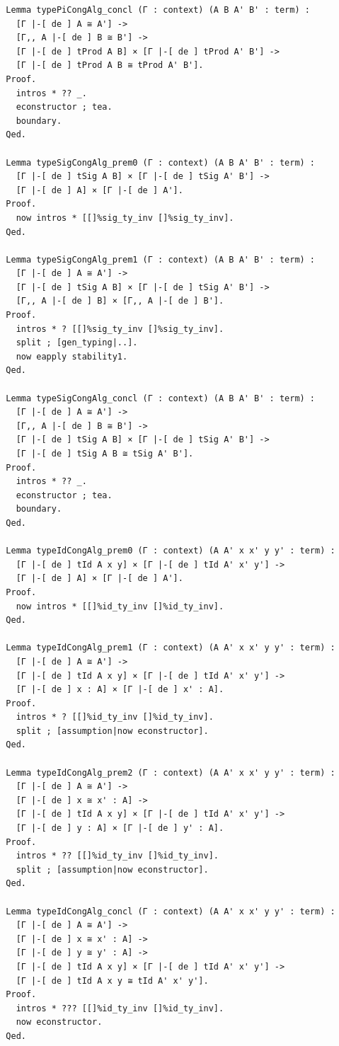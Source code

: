\begin{lstlisting}
  Lemma typePiCongAlg_concl (Γ : context) (A B A' B' : term) :
    [Γ |-[ de ] A ≅ A'] ->
    [Γ,, A |-[ de ] B ≅ B'] ->
    [Γ |-[ de ] tProd A B] × [Γ |-[ de ] tProd A' B'] ->
    [Γ |-[ de ] tProd A B ≅ tProd A' B'].
  Proof.
    intros * ?? _.
    econstructor ; tea.
    boundary.
  Qed.

  Lemma typeSigCongAlg_prem0 (Γ : context) (A B A' B' : term) :
    [Γ |-[ de ] tSig A B] × [Γ |-[ de ] tSig A' B'] ->
    [Γ |-[ de ] A] × [Γ |-[ de ] A'].
  Proof.
    now intros * [[]%sig_ty_inv []%sig_ty_inv].
  Qed.

  Lemma typeSigCongAlg_prem1 (Γ : context) (A B A' B' : term) :
    [Γ |-[ de ] A ≅ A'] ->
    [Γ |-[ de ] tSig A B] × [Γ |-[ de ] tSig A' B'] ->
    [Γ,, A |-[ de ] B] × [Γ,, A |-[ de ] B'].
  Proof.
    intros * ? [[]%sig_ty_inv []%sig_ty_inv].
    split ; [gen_typing|..].
    now eapply stability1.
  Qed.
  
  Lemma typeSigCongAlg_concl (Γ : context) (A B A' B' : term) :
    [Γ |-[ de ] A ≅ A'] ->
    [Γ,, A |-[ de ] B ≅ B'] ->
    [Γ |-[ de ] tSig A B] × [Γ |-[ de ] tSig A' B'] ->
    [Γ |-[ de ] tSig A B ≅ tSig A' B'].
  Proof.
    intros * ?? _.
    econstructor ; tea.
    boundary.
  Qed.

  Lemma typeIdCongAlg_prem0 (Γ : context) (A A' x x' y y' : term) :
    [Γ |-[ de ] tId A x y] × [Γ |-[ de ] tId A' x' y'] ->
    [Γ |-[ de ] A] × [Γ |-[ de ] A'].
  Proof.
    now intros * [[]%id_ty_inv []%id_ty_inv].
  Qed.
  
  Lemma typeIdCongAlg_prem1 (Γ : context) (A A' x x' y y' : term) :
    [Γ |-[ de ] A ≅ A'] ->
    [Γ |-[ de ] tId A x y] × [Γ |-[ de ] tId A' x' y'] ->
    [Γ |-[ de ] x : A] × [Γ |-[ de ] x' : A].
  Proof.
    intros * ? [[]%id_ty_inv []%id_ty_inv].
    split ; [assumption|now econstructor].
  Qed.

  Lemma typeIdCongAlg_prem2 (Γ : context) (A A' x x' y y' : term) :
    [Γ |-[ de ] A ≅ A'] ->
    [Γ |-[ de ] x ≅ x' : A] ->
    [Γ |-[ de ] tId A x y] × [Γ |-[ de ] tId A' x' y'] ->
    [Γ |-[ de ] y : A] × [Γ |-[ de ] y' : A].
  Proof.
    intros * ?? [[]%id_ty_inv []%id_ty_inv].
    split ; [assumption|now econstructor].
  Qed.

  Lemma typeIdCongAlg_concl (Γ : context) (A A' x x' y y' : term) :
    [Γ |-[ de ] A ≅ A'] ->
    [Γ |-[ de ] x ≅ x' : A] ->
    [Γ |-[ de ] y ≅ y' : A] ->
    [Γ |-[ de ] tId A x y] × [Γ |-[ de ] tId A' x' y'] ->
    [Γ |-[ de ] tId A x y ≅ tId A' x' y'].
  Proof.
    intros * ??? [[]%id_ty_inv []%id_ty_inv].
    now econstructor.
  Qed.



\end{lstlisting}
